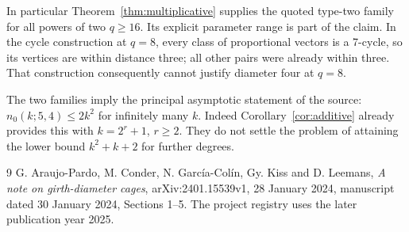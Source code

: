 \documentclass[11pt,a4paper]{article}
\begin{document}
In particular Theorem~\ref{thm:multiplicative} supplies the quoted
type-two family for all powers of two $q\geq16$. Its explicit
parameter range is part of the claim. In the cycle construction
at $q=8$, every class of proportional vectors is a 7-cycle, so its
vertices are within distance three; all other pairs were already
within three. That construction consequently cannot justify
diameter four at $q=8$.

The two families imply the principal asymptotic statement of the
source: $n_0(k;5,4)\leq2k^2$ for infinitely many $k$. Indeed
Corollary~\ref{cor:additive} already provides this with
$k=2^r+1$, $r\geq2$. They do not settle the problem of attaining
the lower bound $k^2+k+2$ for further degrees.

\begin{thebibliography}{9}
G. Araujo-Pardo, M. Conder, N. Garc\'ia-Col\'in, Gy. Kiss and D. Leemans,
\emph{A note on girth-diameter cages}, arXiv:2401.15539v1,
28 January 2024, manuscript dated 30 January 2024, Sections 1--5.
The project registry uses the later publication year 2025.
\end{thebibliography}
\end{document}

